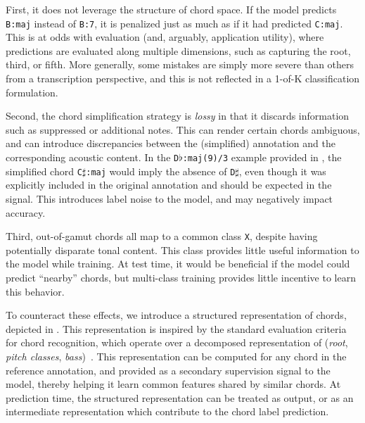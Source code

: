 \documentclass{article}
\begin{document}
First, it does not leverage the structure of chord space.
If the model predicts \texttt{B:maj} instead of \texttt{B:7}, it is penalized just as much as if it had predicted \texttt{C:maj}.
This is at odds with evaluation (and, arguably, application utility), where predictions are evaluated along multiple dimensions, such as capturing the root, third, or fifth.
More generally, some mistakes are simply more severe than others from a transcription perspective, and this is not reflected in a 1-of-K classification formulation.

Second, the chord simplification strategy is \emph{lossy} in that it discards information such as suppressed or additional notes.
This can render certain chords ambiguous, and can introduce discrepancies between the (simplified) annotation and the corresponding acoustic content.
In the \texttt{D}$\flat$\texttt{:maj(9)/3} example provided in , the simplified chord \texttt{C}$\sharp$\texttt{:maj} would imply the absence of \texttt{D}$\sharp$, even though it was explicitly included in the original annotation and should be expected in the signal.
This introduces label noise to the model, and may negatively impact accuracy.

Third, out-of-gamut chords all map to a common class \texttt{X}, despite having potentially disparate tonal content.
This class provides little useful information to the model while training.
At test time, it would be beneficial if the model could predict ``nearby'' chords, but multi-class training provides little incentive to learn this behavior.


To counteract these effects, we introduce a structured representation of chords, depicted in .
This representation is inspired by the standard evaluation criteria for chord recognition, which operate over a decomposed representation of (\emph{root}, \emph{pitch classes}, \emph{bass})~\cite{raffel2014mir_eval}.
This representation can be computed for any chord in the reference annotation, and provided as a secondary supervision signal to the model, thereby helping it learn common features shared by similar chords.
At prediction time, the structured representation can be treated as output, or as an intermediate representation which contribute to the chord label prediction.
\end{document}
